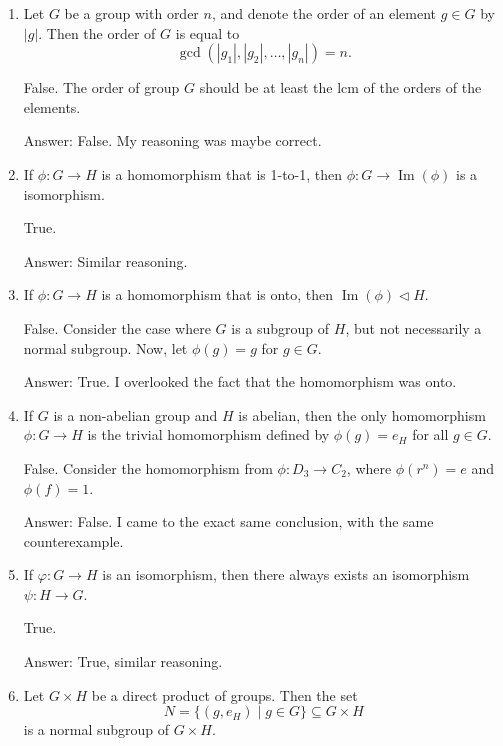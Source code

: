 \documentclass{article}
\begin{document}
\begin{enumerate}
    \item {
        Let \(G\) be a group with order \(n\), and denote the order of an element \(g \in G\) by \(|g|\). Then the order of \(G\) is equal to \[         \gcd(|g_1|, |g_2|, \dots, |g_n|) = n.       \]

        False. The order of group \(G\) should be at least the lcm of the orders 
        of the elements.

        Answer: False. My reasoning was maybe correct.
    }

    \item {
        If \(\phi\colon G \to H\) is a homomorphism that is 1-to-1, then \(\phi\colon G \to \operatorname{Im}(\phi)\) is a isomorphism.
    
        True.

        Answer: Similar reasoning.
    }

    \item {
        If \(\phi\colon G \to H\) is a homomorphism that is onto, then \(\operatorname{Im}(\phi) \triangleleft H\).
    
        False. Consider the case where \(G\) is a subgroup of \(H\), but not 
        necessarily a normal subgroup. Now, let \(\phi(g) = g\) for \(g \in G\). 

        Answer: True. I overlooked the fact that the homomorphism was onto.
    }

    \item {
        If \(G\) is a non-abelian group and \(H\) is abelian, then the only homomorphism \(\phi \colon G \to H\) is the trivial homomorphism defined by \(\phi(g) = e_H\) for all \(g \in G\).

        False. Consider the homomorphism from \(\phi \colon D_3 \to C_2\), where 
        \(\phi(r^n) = e\) and \(\phi(f) = 1\). 

        Answer: False. I came to the exact same conclusion, with the same counterexample.
    }

    \item {
        If \(\varphi \colon G \to H\) is an isomorphism, then there always exists an isomorphism \({\psi \colon H \to G}\).
    
        True.

        Answer: True, similar reasoning.
    }

    \item {
        Let \(G \times H\) be a direct product of groups. Then the set 
        \[         N = \{(g, e_H) \mid g \in G\} \subseteq G \times H       \] 
        is a normal subgroup of \(G \times H\).
    
}
\end{enumerate}
\end{document}
